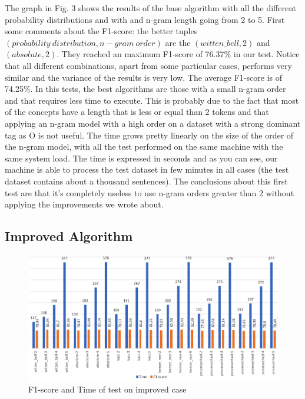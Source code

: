 \documentclass[11pt,a4paper]{article}
\begin{document}
The graph in Fig. 3 shows the results of the base algorithm with all the different probability distributions and with and n-gram length going from 2 to 5. First some comments about the F1-score: the better tuples $(probability\ distribution, n-gram\ order)$ are the $(witten\_bell,2)$ and $(absolute,2)$. They reached an maximum F1-score of 76.37\% in our test. Notice that all different combinations, apart from some particular cases, performs very similar and the variance of the results is very low. The average F1-score is of 74.25\%. In this tests, the best algorithms are those with a small n-gram order and that requires less time to execute. This is probably due to the fact that most of the concepts have a length that is less or equal than 2 tokens and that applying an n-gram model with a high order on a dataset with a strong dominant tag as O is not useful.
The time grows pretty linearly on the size of the order of the n-gram model, with all the test performed on the same machine with the same system load. The time is expressed in seconds and as you can see, our machine is able to process the test dataset in few minutes in all cases (the test dataset contains about a thousand sentences). The conclusions about this first test are that it's completely useless to use n-gram orders greater than 2 without applying the improvements we wrote about.

\subsection{Improved Algorithm}

\begin{figure}
  \includegraphics[width=\textwidth]{test_impr.png}
  \caption{F1-score and Time of test on improved case}
\end{figure}
\end{document}
